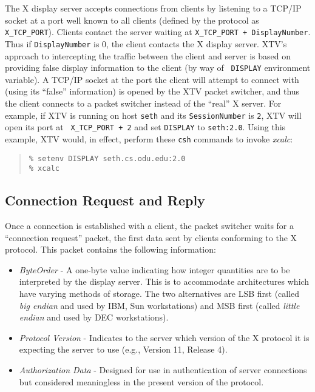 The X display server accepts connections from clients by listening to a
TCP/IP socket at a port well known to all clients (defined by the
protocol as {\tt X\_TCP\_PORT}).  
Clients contact the server 
waiting at {\tt X\_TCP\_PORT + DisplayNumber}.  
Thus if {\tt DisplayNumber} is 0, the client contacts the 
X display server.
XTV's approach to
intercepting the traffic between the client and server is based on
providing false display information to the client (by way of {\tt
DISPLAY} environment variable).  A TCP/IP socket at the port the client
will attempt to connect with (using its ``false'' information) is
opened by the XTV packet switcher, and thus the client connects to a packet 
switcher instead of the
``real'' X server.  For example, if XTV is running on host {\tt seth} and its
{\tt SessionNumber} is {\tt 2}, XTV will open its port at {\tt
X\_TCP\_PORT + 2} and set {\tt DISPLAY} to {\tt seth:2.0}.
Using this example, XTV would, in effect, perform these {\tt csh}
commands to invoke {\it xcalc}:
\begin{quote}
{\tt \% setenv DISPLAY seth.cs.odu.edu:2.0} \\
{\tt \% xcalc}
\end{quote}

%
%
\subsection{Connection Request and Reply}

Once a connection is established with a client, the packet switcher
waits for a ``connection request'' packet, the first data sent by
clients conforming to the X protocol.  This packet contains the
following information:

\begin{itemize}
\item {\it ByteOrder} - A one-byte value indicating how integer
quantities are to be interpreted by the display server.  This is to
accommodate architectures which have varying methods of storage.  The
two alternatives are LSB first (called {\it big endian} and used by
IBM, Sun workstations) and MSB first (called {\it little endian} and
used by DEC workstations).
\item{\it Protocol Version} - Indicates to the server which version of
the X protocol it is expecting the server to use (e.g., Version 11,
Release 4).
\item{\it Authorization Data} - Designed for use in authentication of
server connections but considered meaningless in the present version of
the protocol.
\end{itemize}

